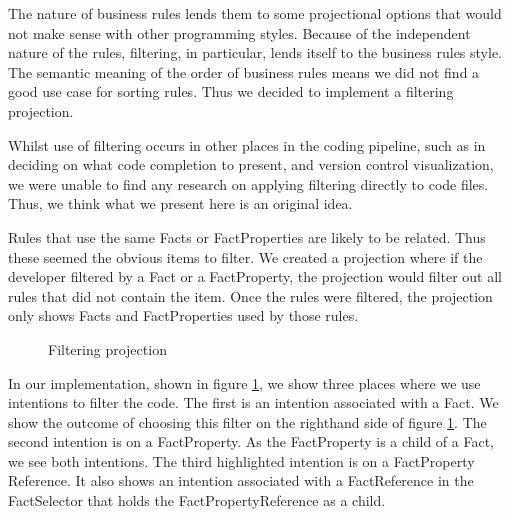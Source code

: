 The nature of business rules lends them to some projectional options that would not make sense with other programming styles.
Because of the independent nature of the rules, filtering, in particular, lends itself to the business rules style.
The semantic meaning of the order of business rules means we did not find a good use case for sorting rules.
Thus we decided to implement a filtering projection.

Whilst use of filtering occurs in other places in the coding pipeline, such as in deciding on what code completion to present\cite{hou2010towards}, and version control visualization\cite{yoon2013visualization}, we were unable to find any research on applying filtering directly to code files.
Thus, we think what we present here is an original idea.

Rules that use the same Facts or FactProperties are likely to be related.
Thus these seemed the obvious items to filter.
We created a projection where if the developer filtered by a Fact or a FactProperty, the projection would filter out all rules that did not contain the item.
Once the rules were filtered, the projection only shows Facts and FactProperties used by those rules.

\begin{figure}[h]
    \centering
    \caption{Filtering projection}
    \label{fig:filteringProjection}
\end{figure}

In our implementation, shown in figure \ref{fig:filteringProjection}, we show three places where we use intentions to filter the code.
The first is an intention associated with a Fact.
We show the outcome of choosing this filter on the righthand side of figure \ref{fig:filteringProjection}.
The second intention is on a FactProperty.
As the FactProperty is a child of a Fact, we see both intentions.
The third highlighted intention is on a FactProperty Reference.
It also shows an intention associated with a FactReference in the FactSelector that holds the FactPropertyReference as a child.

